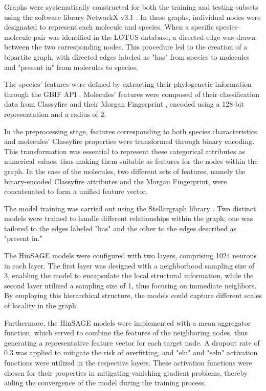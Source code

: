 \documentclass[
11pt, %
english, %
singlespacing, %
headsepline, %
chapterinoneline, %
]{MastersDoctoralThesis} %
\begin{document}
Graphs were systematically constructed for both the training and testing subsets using the software library NetworkX v3.1 \cite{SciPyProceedings_11}. In these graphs, individual nodes were designated to represent each molecule and species. When a specific species-molecule pair was identified in the LOTUS database, a directed edge was drawn between the two corresponding nodes. This procedure led to the creation of a bipartite graph, with directed edges labeled as "has" from species to molecules and "present in" from molecules to species.

The species' features were defined by extracting their phylogenetic information through the GBIF API \cite{GBIF, GbifPygbif2023}. Molecules' features were composed of their classification data from Classyfire \cite{djoumboufeunangClassyFireAutomatedChemical2016} and their Morgan Fingerprint \cite{rogersExtendedConnectivityFingerprints2010}, encoded using a 128-bit representation and a radius of 2.

In the preprocessing stage, features corresponding to both species characteristics and molecules' Classyfire properties were transformed through binary encoding. This transformation was essential to represent these categorical attributes as numerical values, thus making them suitable as features for the nodes within the graph. In the case of the molecules, two different sets of features, namely the binary-encoded Classyfire attributes and the Morgan Fingerprint, were concatenated to form a unified feature vector.

The model training was carried out using the Stellargraph library \cite{StellarGraphMachineLearning2018}. Two distinct models were trained to handle different relationships within the graph; one was tailored to the edges labeled "has" and the other to the edges described as "present in."

The HinSAGE models were configured with two layers, comprising 1024 neurons in each layer. The first layer was designed with a neighborhood sampling size of 3, enabling the model to encapsulate the local structural information, while the second layer utilized a sampling size of 1, thus focusing on immediate neighbors. By employing this hierarchical structure, the models could capture different scales of locality in the graph.

Furthermore, the HinSAGE models were implemented with a mean aggregator function, which served to combine the features of the neighboring nodes, thus generating a representative feature vector for each target node. A dropout rate of 0.3 was applied to mitigate the risk of overfitting, and "elu" and "selu" activation functions were utilized in the respective layers. These activation functions were chosen for their properties in mitigating vanishing gradient problems, thereby aiding the convergence of the model during the training process.
\end{document}
